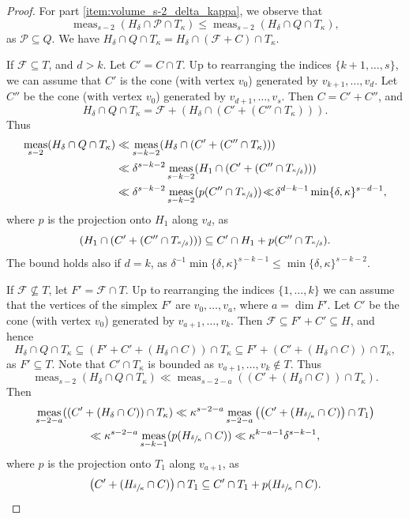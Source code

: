 \documentclass[11pt]{article}
\numberwithin{equation}{section}
\DeclareMathOperator{\meas}{meas}
\theoremstyle{definition}
\numberwithin{theorem}{section}
\begin{document}
\begin{proof}
For part \eqref{item:volume_s-2_delta_kappa}, we observe that
\[
\meas_{s-2}(H_\delta\cap \mathcal P \cap T_\kappa) \leq \meas_{s-2}(H_\delta\cap Q \cap T_\kappa),
\]
as $\mathcal P\subseteq Q$.
We have
$
H_\delta\cap Q\cap T_\kappa=H_\delta\cap (\mathcal F+C)\cap T_\kappa.
$

If $\mathcal F\subseteq T$, and $d>k$. Let $C'=C\cap T$. Up to rearranging the indices $\{k+1,\dots,s\}$, we can assume that $C'$ is the cone (with vertex $v_0$) generated by $v_{k+1},\dots,v_{d}$. Let $C''$ be the cone (with vertex $v_0$) generated by $v_{d+1},\dots,v_s$. Then $C=C'+C''$, and
\[
H_\delta\cap Q\cap T_\kappa=\mathcal F+(H_\delta\cap (C'+(C''\cap T_\kappa))).
\]
Thus
\begin{align*}
\meas_{s-2}(H_\delta\cap Q\cap T_\kappa)
&\ll\meas_{s-k-2}(H_\delta\cap (C'+(C''\cap T_\kappa)))\\
&\ll \delta^{s-k-2}\meas_{s-k-2}(H_1\cap (C'+(C''\cap T_{\sfrac{\kappa}{\delta}})))\\
&\ll \delta^{s-k-2}\meas_{s-k-2}(p(C''\cap T_{\sfrac{\kappa}{\delta}}))
\!\ll\! \delta^{d-k-1}\min\{\delta,\kappa\}^{s-d-1},
\end{align*}
where $p$ is the projection onto $H_1$ along $v_{d}$,
as \[
(H_1\cap (C'+(C''\cap T_{\sfrac{\kappa}{\delta}})))\subseteq C'\cap H_1+p(C''\cap T_{\sfrac{\kappa}{\delta}}).
\]
The bound holds also if $d=k$, as $\delta^{-1}\min\{\delta,\kappa\}^{s-k-1}\leq \min\{\delta,\kappa\}^{s-k-2}.$

If $\mathcal F\not\subseteq T$, let $F'=\mathcal F\cap T$. Up to rearranging the indices $\{1,\dots,k\}$ we can assume that the vertices of the simplex $F'$ are $v_0,\dots,v_a$, where $a=\dim F'$.
Let $C'$ be the cone (with vertex $v_0$) generated by $v_{a+1},\dots,v_k$.
Then $\mathcal F\subseteq F'+C'\subseteq H$, and hence
\[
H_\delta\cap Q\cap T_\kappa
\subseteq (F'+C'+(H_\delta\cap C))\cap T_\kappa
\subseteq F'+ (C'+(H_\delta\cap C))\cap T_\kappa,
\]
as $F'\subseteq T$. Note that $C'\cap T_\kappa$ is bounded as $v_{a+1},\dots,v_k\notin T$. Thus
\[
\meas_{s-2}(H_\delta\cap Q\cap T_\kappa)\ll\meas_{s-2-a}((C'+(H_\delta\cap C))\cap T_\kappa).
\]
Then
\begin{multline*}
\meas_{s-2-a}((C'+(H_\delta\cap C))\cap T_\kappa)
\ll \kappa^{s-2-a}\meas_{s-2-a}\left(\left(C'+(H_{{\sfrac \delta \kappa}}\cap C)\right)\cap T_1\right)\\
\ll \kappa^{s-2-a}\meas_{s-k-1}(p(H_{{\sfrac \delta \kappa}}\cap C))
\ll \kappa^{k-a-1}\delta^{s-k-1},
\end{multline*}
where $p$ is the projection onto $T_1$ along $v_{a+1}$,
as \[
\left(C'+(H_{{\sfrac \delta \kappa}}\cap C)\right)\cap T_1\subseteq C'\cap T_1+p(H_{{\sfrac \delta \kappa}}\cap C).
\]


\end{proof}
\end{document}

